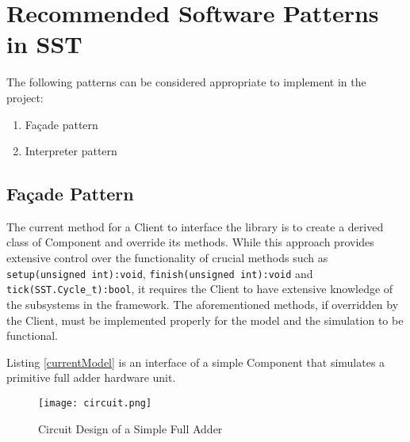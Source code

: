 \section{Recommended Software Patterns in SST}
The following patterns can be considered appropriate to implement in the project:
\begin{enumerate}
  \item Façade pattern
  \item Interpreter pattern
\end{enumerate}

\subsection{Façade Pattern}
The current method for a Client to interface the library is to create a derived class of Component and override its methods. While this approach provides extensive control over the functionality of crucial methods such as \texttt{setup(unsigned int):void}, \texttt{finish(unsigned int):void} and \texttt{tick(SST.Cycle\_t):bool}, it requires the Client to have extensive knowledge of the subsystems in the framework. The aforementioned methods, if overridden by the Client, must be implemented properly for the model and the simulation to be functional.

Listing \ref{currentModel} is an interface of a simple Component that simulates a primitive full adder hardware unit.

\begin{figure}[h]
  \caption{Circuit Design of a Simple Full Adder}
  \centering
  \texttt{[image: circuit.png]}
\end{figure}

